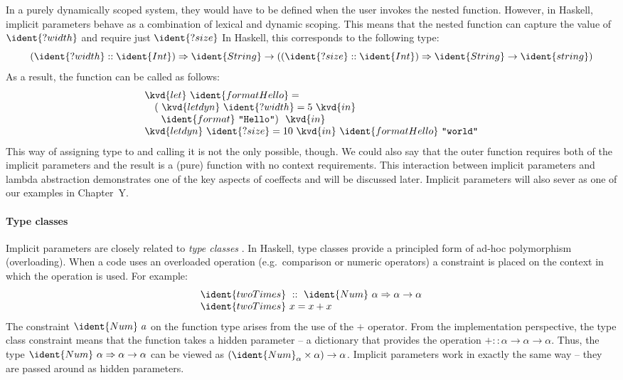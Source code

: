 In a purely dynamically scoped system, they would have to be defined when the user invokes the nested function.
However, in Haskell, implicit parameters behave as a combination of lexical and dynamic scoping. This means
that the nested function can capture the value of $\ident{?width}$ and require just $\ident{?size}$
In Haskell, this corresponds to the following type:
%
\begin{equation*}
(\ident{?width} :: \ident{Int}) \Rightarrow \ident{String} \rightarrow 
  ((\ident{?size} :: \ident{Int}) \Rightarrow \ident{String} \rightarrow \ident{string})
\end{equation*}
%
As a result, the function can be called as follows:
%
\begin{equation*}
\begin{array}{l}
\kvd{let}~\ident{formatHello} = \\
\quad(~\kvd{letdyn}~\ident{?width}=5~\kvd{in}\\
\quad~~\ident{format}~\texttt{"Hello"})~~\kvd{in}\\
\kvd{letdyn}~\ident{?size} = 10~\kvd{in}~\ident{formatHello}~\texttt{"world"}
\end{array}
\end{equation*}
%
This way of assigning type to  and calling it is not the only possible, though. 
We could also say that the outer function requires both of the implicit parameters and the result
is a (pure) function with no context requirements. This interaction between implicit parameters 
and lambda abstraction demonstrates one of the key aspects of coeffects and will be discussed 
later. Implicit parameters will also sever as one of our examples in Chapter~Y.


\paragraph{Type classes}
Implicit parameters are closely related to \emph{type classes} \cite{app-type-classes}. In Haskell,
type classes provide a principled form of ad-hoc polymorphism (overloading). When a code uses 
an overloaded operation (e.g.~comparison or numeric operators) a constraint is placed on the 
context in which the operation is used. For example:
%
\begin{equation*}
\begin{array}{l}
\ident{twoTimes}~::~\ident{Num}~\alpha \Rightarrow \alpha \rightarrow \alpha \\
\ident{twoTimes}~x=x+x
\end{array}
\end{equation*}
%
The constraint $\ident{Num}~a$ on the function type arises from the use of the $+$ operator. 
From the implementation perspective, the type class constraint means that the function takes 
a hidden parameter -- a dictionary that provides the operation $+ :: \alpha \rightarrow \alpha \rightarrow \alpha$.
Thus, the type $\ident{Num}~\alpha \Rightarrow \alpha \rightarrow \alpha$ can be viewed as
$(\ident{Num}_\alpha \times \alpha) \rightarrow \alpha$. Implicit parameters work in exactly
the same way -- they are passed around as hidden parameters.

